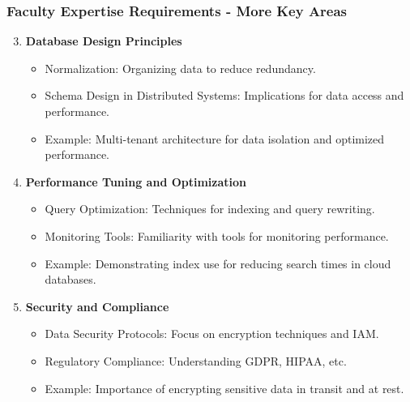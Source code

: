 \documentclass[aspectratio=169]{beamer}
\begin{document}
\begin{frame}[fragile]
    \frametitle{Faculty Expertise Requirements - More Key Areas}
    \begin{enumerate}
        \setcounter{enumi}{2} %
        \item \textbf{Database Design Principles}
        \begin{itemize}
            \item Normalization: Organizing data to reduce redundancy.
            \item Schema Design in Distributed Systems: Implications for data access and performance.
            \item Example: Multi-tenant architecture for data isolation and optimized performance.
        \end{itemize}

        \item \textbf{Performance Tuning and Optimization}
        \begin{itemize}
            \item Query Optimization: Techniques for indexing and query rewriting.
            \item Monitoring Tools: Familiarity with tools for monitoring performance.
            \item Example: Demonstrating index use for reducing search times in cloud databases.
        \end{itemize}
        
        \item \textbf{Security and Compliance}
        \begin{itemize}
            \item Data Security Protocols: Focus on encryption techniques and IAM.
            \item Regulatory Compliance: Understanding GDPR, HIPAA, etc.
            \item Example: Importance of encrypting sensitive data in transit and at rest.
        \end{itemize}
    \end{enumerate}
\end{frame}
\end{document}

